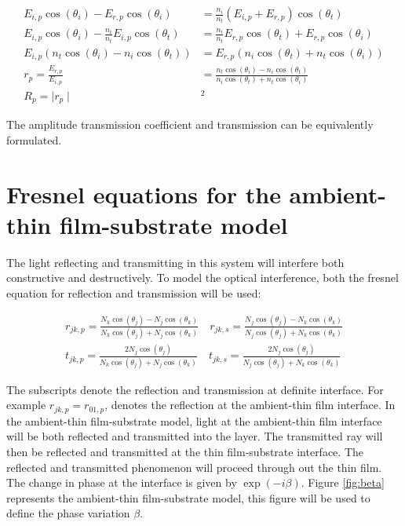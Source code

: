 \documentclass[MasterThesisMain.tex]{subfiles}
\begin{document}
\begin{align}
E_{i,p}\cos(\theta_i)-E_{r,p}\cos(\theta_i) &= \frac{n_i}{n_t}(E_{i,p}+E_{r,p}) \cos(\theta_t) \\
E_{i,p}\cos(\theta_i) - \frac{n_i}{n_t}E_{i,p} \cos(\theta_t) &= \frac{n_i}{n_t}E_{r,p} \cos(\theta_t) + E_{r,p} \cos(\theta_i)\\
E_{i,p}(n_t\cos(\theta_i)-n_i\cos(\theta_t)) &= E_{r,p}(n_i\cos(\theta_t)+n_t\cos(\theta_i))\\
r_p = \frac{E_{r,p}}{E_{i,p}} &= \frac{n_t\cos(\theta_i)-n_i\cos(\theta_t)}{n_i\cos(\theta_t)+n_t\cos(\theta_i)} \label{eq:a-srefl}\\
R_p = \mid r_p \mid &^2 
\end{align}

The amplitude transmission coefficient and transmission can be equivalently formulated. 

\section{Fresnel equations for the ambient-thin film-substrate model}
The light reflecting and transmitting in this system will interfere both constructive and destructively. To model the optical interference, both the fresnel equation for reflection and transmission will be used:

\begin{align}
r_{jk,p} = \frac{N_k\cos(\theta_j)-N_j\cos(\theta_k)}{N_k\cos(\theta_j)+N_j\cos(\theta_k)} \quad r_{jk,s} = \frac{N_j\cos(\theta_j)-N_k\cos(\theta_k)}{N_j\cos(\theta_j)+N_k\cos(\theta_k)} \\
t_{jk,p} = \frac{2N_j\cos(\theta_j)}{N_k\cos(\theta_j)+N_j\cos(\theta_k)} \quad t_{jk,s} = \frac{2N_j\cos(\theta_j)}{N_j\cos(\theta_j)+N_k\cos(\theta_k)} 
\end{align}

The subscripts denote the reflection and transmission at definite interface. For example $r_{jk,p} = r_{01,p}$, denotes the reflection at the ambient-thin film interface. In the ambient-thin film-substrate model, light at the ambient-thin film interface will be both reflected and transmitted into the layer. The transmitted ray will then be reflected and transmitted at the thin film-substrate interface. The reflected and transmitted phenomenon will proceed through out the thin film. The change in phase at the interface is given by $\exp(-i\beta)$. Figure \ref{fig:beta} represents the ambient-thin film-substrate model, this figure will be used to define the phase variation $\beta$.
\end{document}
